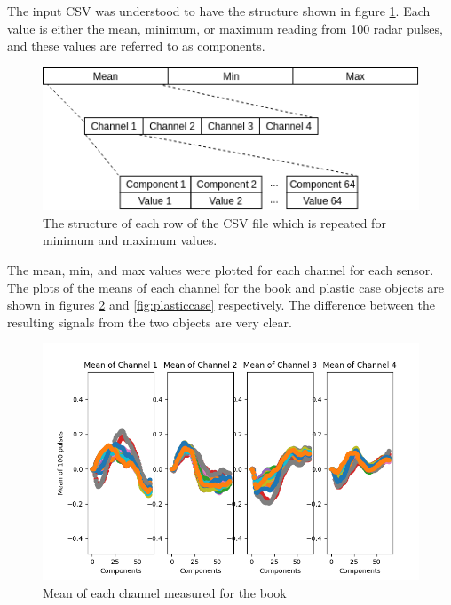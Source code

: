\documentclass[12pt]{article}
\begin{document}
The input CSV was understood to have the structure shown in figure \ref{fig:structure}. Each value is either the mean, minimum, or maximum reading from 100 radar pulses, and these values are referred to as components.

\begin{figure}[!ht]
	\centering
	\includegraphics[width=\linewidth]{images/structure}
	\caption{The structure of each row of the CSV file which is repeated for minimum and maximum values.}
	\label{fig:structure}
\end{figure}

The mean, min, and max values were plotted for each channel for each sensor. The plots of the means of each channel for the book and plastic case objects are shown in figures \ref{fig:book} and \ref{fig:plasticcase} respectively. The difference between the resulting signals from the two objects are very clear.

\begin{figure}[!ht]
	\centering
	\includegraphics[width=\linewidth]{images/book}
	\caption{Mean of each channel measured for the book}
	\label{fig:book}
\end{figure}
\end{document}
